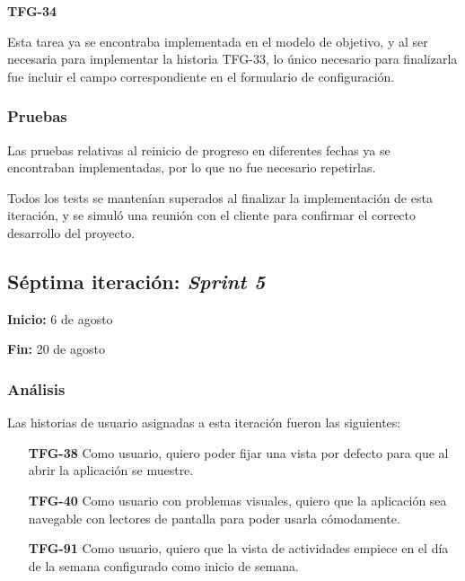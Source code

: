 \documentclass[10pt, a4paper]{aqademic}
\begin{document}
\medskip

\textbf{TFG-34}

Esta tarea ya se encontraba implementada en el modelo de objetivo, y al ser necesaria para implementar la historia TFG-33, lo único necesario para finalizarla fue incluir el campo correspondiente en el formulario de configuración.

\medskip


\subsubsection{Pruebas}

Las pruebas relativas al reinicio de progreso en diferentes fechas ya se encontraban implementadas, por lo que no fue necesario repetirlas.

Todos los tests se mantenían superados al finalizar la implementación de esta iteración, y se simuló una reunión con el cliente para confirmar el correcto desarrollo del proyecto.



\subsection{Séptima iteración: \textit{Sprint 5}}

\textbf{Inicio:} 6 de agosto

\textbf{Fin:} 20 de agosto


\subsubsection{Análisis}

Las historias de usuario asignadas a esta iteración fueron las siguientes:

\begin{itemize}[leftmargin=16mm]
	\item [\textbf{TFG-38}] Como usuario, quiero poder fijar una vista por defecto para que al abrir la aplicación se muestre.
	
	\item [\textbf{TFG-40}] Como usuario con problemas visuales, quiero que la aplicación sea navegable con lectores de pantalla para poder usarla cómodamente.
	
	\item [\textbf{TFG-91}] Como usuario, quiero que la vista de actividades empiece en el día de la semana configurado como inicio de semana.
\end{itemize}
\end{document}
